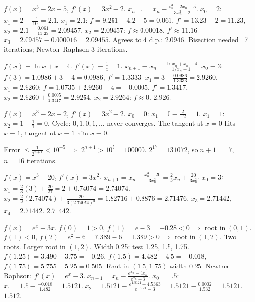 \documentclass[11pt]{article}
\begin{document}
\begin{corrige}[Exercise 2]
$f(x)=x^3-2x-5$, $f'(x)=3x^2-2$. $x_{n+1}=x_n-\frac{x_n^3-2x_n-5}{3x_n^2-2}$.
$x_0=2$: $x_1=2-\frac{-1}{10}=2.1$.
$x_1=2.1$: $f=9.261-4.2-5=0.061$, $f'=13.23-2=11.23$, $x_2=2.1-\frac{0.061}{11.23}=2.09457$.
$x_2=2.09457$: $f\approx 0.00018$, $f'\approx 11.16$, $x_3=2.09457-0.000016=2.09455$.
Agrees to 4 d.p.: $\boxed{2.0946}$. Bisection needed ~7 iterations; Newton--Raphson 3 iterations.
\end{corrige}

\begin{corrige}[Exercise 3]
$f(x)=\ln x + x - 4$. $f'(x)=\frac{1}{x}+1$. $x_{n+1}=x_n-\frac{\ln x_n+x_n-4}{1/x_n+1}$.
$x_0=3$: $f(3)=1.0986+3-4=0.0986$, $f'=1.3333$, $x_1=3-\frac{0.0986}{1.3333}=2.9260$.
$x_1=2.9260$: $f=1.0735+2.9260-4=-0.0005$, $f'=1.3417$, $x_2=2.9260+\frac{0.0005}{1.3417}=2.9264$.
$x_2=2.9264$: $f\approx 0$. $\boxed{2.926}$.
\end{corrige}

\begin{corrige}[Exercise 4]
$f(x)=x^3-2x+2$, $f'(x)=3x^2-2$. $x_0=0$: $x_1=0-\frac{2}{-2}=1$. $x_1=1$: $x_2=1-\frac{1}{1}=0$. Cycle: $0,1,0,1,\dots$ never converges. The tangent at $x=0$ hits $x=1$, tangent at $x=1$ hits $x=0$.
\end{corrige}

\begin{corrige}[Exercise 5]
Error $\leq \frac{1}{2^{n+1}} < 10^{-5}$ $\Rightarrow$ $2^{n+1} > 10^5 = 100000$. $2^{17}=131072$, so $n+1=17$, $n=16$ iterations.
\end{corrige}

\begin{corrige}[Exercise 6]
$f(x)=x^3-20$, $f'(x)=3x^2$. $x_{n+1}=x_n-\frac{x_n^3-20}{3x_n^2}=\frac{2}{3}x_n+\frac{20}{3x_n^2}$.
$x_0=3$: $x_1=\frac{2}{3}(3)+\frac{20}{27}=2+0.74074=2.74074$.
$x_2=\frac{2}{3}(2.74074)+\frac{20}{3(2.74074)^2}=1.82716+0.8876=2.71476$.
$x_3=2.71442$, $x_4=2.71442$. $\boxed{2.71442}$.
\end{corrige}

\begin{corrige}[Exercise 7]
$f(x)=e^x-3x$. $f(0)=1>0$, $f(1)=e-3=-0.28<0$ $\Rightarrow$ root in $(0,1)$.
$f(1)<0$, $f(2)=e^2-6=7.389-6=1.389>0$ $\Rightarrow$ root in $(1,2)$.
Two roots. Larger root in $(1,2)$. Width 0.25: test 1.25, 1.5, 1.75.
$f(1.25)=3.490-3.75=-0.26$, $f(1.5)=4.482-4.5=-0.018$, $f(1.75)=5.755-5.25=0.505$.
Root in $(1.5,1.75)$ width 0.25.
Newton--Raphson: $f'(x)=e^x-3$. $x_{n+1}=x_n-\frac{e^{x_n}-3x_n}{e^{x_n}-3}$.
$x_0=1.5$: $x_1=1.5-\frac{-0.018}{1.482}=1.5121$.
$x_2=1.5121-\frac{e^{1.5121}-4.5363}{e^{1.5121}-3}=1.5121-\frac{0.0002}{1.532}=1.5121$.
$\boxed{1.512}$.
\end{corrige}
\end{document}
